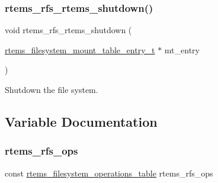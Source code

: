 \subsubsection{\texorpdfstring{rtems\_rfs\_rtems\_shutdown()}{rtems\_rfs\_rtems\_shutdown()}}
{\footnotesize\ttfamily void rtems\+\_\+rfs\+\_\+rtems\+\_\+shutdown (\begin{DoxyParamCaption}\item[{\mbox{\hyperlink{structrtems__filesystem__mount__table__entry__tt}{rtems\+\_\+filesystem\+\_\+mount\+\_\+table\+\_\+entry\+\_\+t}} $\ast$}]{mt\+\_\+entry }\end{DoxyParamCaption})}

Shutdown the file system. 

\subsection{Variable Documentation}
\mbox{\label{rtems-rfs-rtems_8c_a7ad51127fb7bd67172b491a6dfb7d4d9}} 
\subsubsection{\texorpdfstring{rtems\_rfs\_ops}{rtems\_rfs\_ops}}
{\footnotesize\ttfamily const \mbox{\hyperlink{struct__rtems__filesystem__operations__table}{rtems\+\_\+filesystem\+\_\+operations\+\_\+table}} rtems\+\_\+rfs\+\_\+ops}


